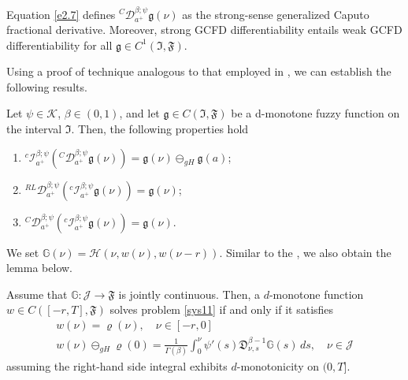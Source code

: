 \documentclass[reqno]{amsart}
\begin{document}
\begin{remark} \label{rmk2.2} \rm
Equation \eqref{e2.7} defines \(^C \mathcal{D}_{a^{+}}^{\beta ; \psi} \mathfrak{g}(\nu )\)
as the strong-sense generalized Caputo fractional derivative. 
Moreover, strong GCFD differentiability entails weak GCFD differentiability for all 
\(\mathfrak{g} \in C^1(\mathfrak{I}, \mathfrak{F})\).
\end{remark}

Using a proof of technique analogous to that employed in 
\cite[Prop. 1 and Corollary 1]{hoa2018}, we can establish the following results.

\begin{theorem}\label{thm2}
Let \(\psi \in \mathcal{K}\), \(\beta \in (0,1)\), and let 
\(\mathfrak{g} \in C(\mathfrak{I}, \mathfrak{F})\) be a d-monotone fuzzy function on 
the interval \(\mathfrak{I}\). Then, the following properties hold
\begin{enumerate}
\item ${}^{c} \mathcal{I}_{a^{+}}^{\beta ; \psi} ( {}^C \mathcal{D}_{a^{+}}^{\beta ; 
\psi} \mathfrak{g}(\nu ) ) = \mathfrak{g}(\nu ) \ominus_{gH} \mathfrak{g}(a)$;

\item ${}^{RL} \mathcal{D}_{a^{+}}^{\beta ; \psi} ( {}^{c} 
\mathcal{I}_{a^{+}}^{\beta ; \psi} \mathfrak{g}(\nu ) ) = \mathfrak{g}(\nu )$;

\item ${}^C \mathcal{D}_{a^{+}}^{\beta ; \psi} ( {}^{c} \mathcal{I}_{a^{+}}^{\beta ; 
\psi} \mathfrak{g}(\nu ) ) = \mathfrak{g}(\nu )$.
\end{enumerate}
\end{theorem}

We set $\mathbb{G}(\nu )=\mathcal{H}(\nu , w(\nu ), w(\nu - r ))$. Similar to the 
\cite[Theorem 3]{hoa2018}, we also obtain the lemma below.

\begin{lemma}\label{lem1}
Assume that \(\mathbb{G} : \mathcal{J} \to \mathfrak{F}\) is jointly continuous. 
Then, a \(d\)-monotone function \( w \in C([- r, T], \mathfrak{F})\) solves problem 
\eqref{sys11} if and only if it satisfies
\begin{equation} \label{sys28}
\begin{gathered}
 w(\nu )=\varrho(\nu ), \quad \nu \in[- r, 0]  \\
 w(\nu ) \ominus_{g H} \varrho(0)=\frac{1}{\Gamma(\beta)} \int_0^{\nu }
 \psi'(s)\mathfrak{D}_{\nu ,s}^{\beta-1} \mathbb{G}(s)\,ds, \quad \nu \in\mathcal{J}
\end{gathered}
\end{equation}
assuming the right-hand side integral exhibits \(d\)-monotonicity on \((0, T]\).
\end{lemma}
\end{document}
